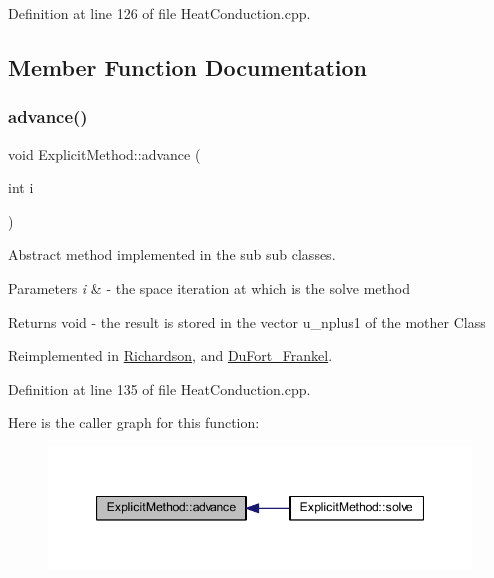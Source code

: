 Definition at line 126 of file Heat\+Conduction.\+cpp.



\subsection{Member Function Documentation}
\mbox{\label{class_explicit_method_afdff9dbaacf767cdfe295103f3de41ef}} 
\subsubsection{\texorpdfstring{advance()}{advance()}}
{\footnotesize\ttfamily void Explicit\+Method\+::advance (\begin{DoxyParamCaption}\item[{int}]{i }\end{DoxyParamCaption})\hspace{0.3cm}{\ttfamily [virtual]}}



Abstract method implemented in the sub sub classes. 


\begin{DoxyParams}{Parameters}
{\em i} & -\/ the space iteration at which is the solve method \\
\hline
\end{DoxyParams}
\begin{DoxyReturn}{Returns}
void -\/ the result is stored in the vector u\+\_\+nplus1 of the mother Class 
\end{DoxyReturn}


Reimplemented in \hyperlink{class_richardson_a9be0699e321b038d9361c209b3d542cb}{Richardson}, and \hyperlink{class_du_fort___frankel_ae8a6c6c56b2a4ce3bf7f80075a2cf680}{Du\+Fort\+\_\+\+Frankel}.



Definition at line 135 of file Heat\+Conduction.\+cpp.

Here is the caller graph for this function\+:\nopagebreak
\begin{figure}[H]
\begin{center}
\leavevmode
\includegraphics[width=347pt]{class_explicit_method_afdff9dbaacf767cdfe295103f3de41ef_icgraph}
\end{center}
\end{figure}
\mbox{\label{class_explicit_method_a096efa29c4315794c60182e31c54a45e}} 
